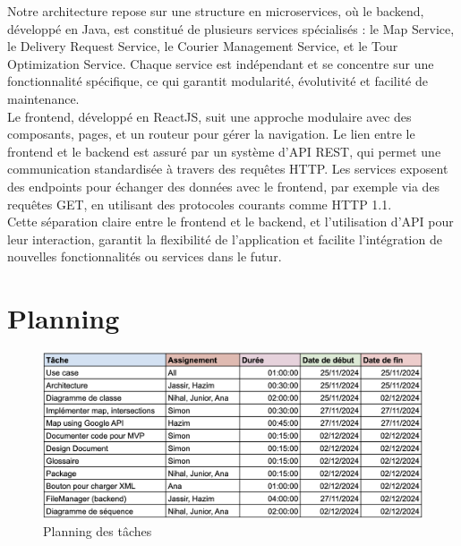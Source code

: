 \documentclass[a4paper]{article}
\begin{document}
Notre architecture repose sur une structure en microservices, où le backend, développé en Java, est constitué de plusieurs services spécialisés : le Map Service, le Delivery Request Service, le Courier Management Service, et le Tour Optimization Service. Chaque service est indépendant et se concentre sur une fonctionnalité spécifique, ce qui garantit modularité, évolutivité et facilité de maintenance. \\

Le frontend, développé en ReactJS, suit une approche modulaire avec des composants, pages, et un routeur pour gérer la navigation. Le lien entre le frontend et le backend est assuré par un système d’API REST, qui permet une communication standardisée à travers des requêtes HTTP. Les services exposent des endpoints pour échanger des données avec le frontend, par exemple via des requêtes GET, en utilisant des protocoles courants comme HTTP 1.1. \\

Cette séparation claire entre le frontend et le backend, et l'utilisation d'API pour leur interaction, garantit la flexibilité de l'application et facilite l'intégration de nouvelles fonctionnalités ou services dans le futur.


\section{Planning}

\begin{figure}[H]
    \centering
    \includegraphics[width=0.75\linewidth]{images/planning.png}
    \caption{Planning des tâches}
\end{figure}
\end{document}

